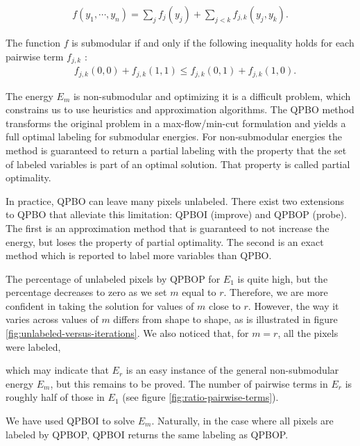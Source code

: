 \documentclass[smallextended]{svjour3}       %
\begin{document}
{\begin{align*}
f(y_1,\cdots, y_n) = \sum_{j}{f_j(y_j)} + \sum_{j < k}{f_{j,k}(y_j,y_k)}.
\end{align*}

The function $f$ is submodular if and only if the following inequality holds for each pairwise term $f_{j,k}$ \cite{kolmogorov04whatenergies}:
\begin{align*}
  \quad f_{j,k}(0,0) + f_{j,k}(1,1) \leq f_{j,k}(0,1) + f_{j,k}(1,0).
\end{align*}

The energy $E_m$ is non-submodular and optimizing it is a difficult problem, which constrains us to use heuristics and
approximation algorithms. The QPBO method \cite{rother07qpbo} transforms the original problem in a max-flow/min-cut
formulation and yields a full optimal labeling for submodular energies. For non-submodular energies the method is
guaranteed to return a partial labeling with the property that the set of labeled variables is part of an optimal
solution. That property is called partial optimality.

In practice, QPBO can leave many pixels unlabeled. There exist two extensions to QPBO that alleviate this limitation:
QPBOI (improve) and QPBOP (probe). The first is an approximation method that is guaranteed to not increase the energy,
but loses the property of partial optimality. The second is an exact method which is reported to label more variables
than QPBO.

The percentage of unlabeled pixels by QPBOP for $E_1$ is quite high, but the percentage decreases to zero as we set $m$
equal to $r$. Therefore, we are more confident in taking the solution for values of $m$ close to $r$. However, the way it
varies across values of $m$ differs from shape to shape, as is illustrated in figure
\ref{fig:unlabeled-versus-iterations}. We also noticed that, for $m=r$, all the pixels were labeled, {which may
  indicate that $E_r$ is an easy instance of the general non-submodular energy $E_m$, but this remains to be
  proved. The number of pairwise terms in $E_r$ is roughly half of those in $E_1$ (see figure
  \ref{fig:ratio-pairwise-terms}).

  We have used QPBOI to solve $E_m$. Naturally, in the case where all pixels are labeled by QPBOP, QPBOI returns the
  same labeling as QPBOP.


}}
\end{document}
